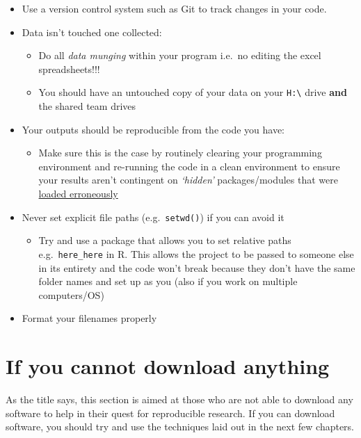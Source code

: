 \documentclass[]{book}
\providecommand{\tightlist}{%
  \setlength{\itemsep}{0pt}\setlength{\parskip}{0pt}}
\begin{document}
\begin{itemize}
\tightlist
\item
  Use a version control system such as Git to track changes in your code.
\item
  Data isn't touched one collected:

  \begin{itemize}
  \tightlist
  \item
    Do all \emph{data munging} within your program i.e.~no editing the excel spreadsheets!!!
  \item
    You should have an untouched copy of your data on your \texttt{H:\textbackslash{}} drive \textbf{and} the shared team drives
  \end{itemize}
\item
  Your outputs should be reproducible from the code you have:

  \begin{itemize}
  \tightlist
  \item
    Make sure this is the case by routinely clearing your programming environment and re-running the code in a clean environment to ensure your results aren't contingent on \emph{`hidden'} packages/modules that were \href{https://onunicornsandgenes.blog/2017/04/02/using-r-dont-save-your-workspace/}{loaded erroneously}
  \end{itemize}
\item
  Never set explicit file paths (e.g.~\texttt{setwd()}) if you can avoid it

  \begin{itemize}
  \tightlist
  \item
    Try and use a package that allows you to set relative paths e.g.~\texttt{here\_here} in R. This allows the project to be passed to someone else in its entirety and the code won't break because they don't have the same folder names and set up as you (also if you work on multiple computers/OS)
  \end{itemize}
\item
  Format your filenames properly
\end{itemize}

\hypertarget{if-you-cannot-download-anything}{%
\chapter{If you cannot download anything}\label{if-you-cannot-download-anything}}

As the title says, this section is aimed at those who are not able to download any software to help in their quest for reproducible research. If you can download software, you should try and use the techniques laid out in the next few chapters.
\end{document}
